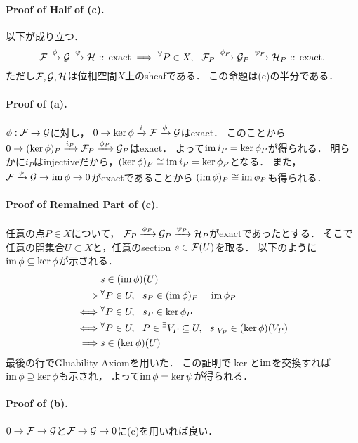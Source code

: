 \documentclass[a4paper]{jsarticle}
\begin{document}
    \paragraph{Proof of Half of (c).}
    以下が成り立つ．
    \[
        \mathcal{F} \xrightarrow{\phi} \mathcal{G} \xrightarrow{\psi} \mathcal{H} \text{ :: exact}
        \implies
        {}^{\forall} P \in X,~~
        \mathcal{F}_P \xrightarrow{\phi_P} \mathcal{G}_P \xrightarrow{\psi_P} \mathcal{H}_P \text{ :: exact}.
    \]
    ただし$\mathcal{F},\mathcal{G},\mathcal{H}$は位相空間$X$上のsheafである．
    この命題は(c)の半分である．

    \paragraph{Proof of (a).}
    $\phi: \mathcal{F} \to \mathcal{G}$に対し，
    $0 \to \ker \phi \xrightarrow{i} \mathcal{F} \xrightarrow{\phi} \mathcal{G}$はexact．
    このことから
    $0 \to (\ker \phi)_P \xrightarrow{i_P} \mathcal{F}_P \xrightarrow{\phi_P} \mathcal{G}_P$はexact．
    よって$\operatorname{im} i_P=\ker \phi_P$が得られる．
    明らかに$i_P$はinjectiveだから，$(\ker \phi)_P \cong \operatorname{im} i_P=\ker \phi_P$となる．
    また，$\mathcal{F} \xrightarrow{\phi} \mathcal{G} \to \operatorname{im} \phi \to 0$がexactであることから
    $(\operatorname{im} \phi)_P \cong \operatorname{im} \phi_P$も得られる．

    \paragraph{Proof of Remained Part of (c).}
    任意の点$P \in X$について，
    $\mathcal{F}_P \xrightarrow{\phi_P} \mathcal{G}_P \xrightarrow{\psi_P} \mathcal{H}_P$がexactであったとする．
    そこで任意の開集合$U \subset X$と，任意のsection $s \in \mathcal{F}(U)$を取る．
    以下のように$\operatorname{im} \phi \subseteq \ker \phi$が示される．
    \begin{align*}
        {}&         s \in (\operatorname{im} \phi)(U) \\
        \implies&   {}^{\forall} P \in U,~~ s_P \in (\operatorname{im} \phi)_P=\operatorname{im} \phi_P \\
        \iff&       {}^{\forall} P \in U,~~ s_P \in \ker \phi_P \\
        \iff&       {}^{\forall} P \in U,~~ P \in {}^{\exists} V_P \subseteq U,~~ s|_{V_P} \in (\ker \phi)(V_P) \\
        \implies&   s \in (\ker \phi)(U)
    \end{align*}
    最後の行でGluability Axiomを用いた．
    この証明で$\ker$と$\operatorname{im}$を交換すれば$\operatorname{im} \phi \supseteq \ker \phi$も示され，
    よって$\operatorname{im} \phi=\ker \psi$が得られる．

    \paragraph{Proof of (b).}
    $0 \to \mathcal{F} \to \mathcal{G}$と$\mathcal{F} \to \mathcal{G} \to 0$に(c)を用いれば良い．
\end{document}
